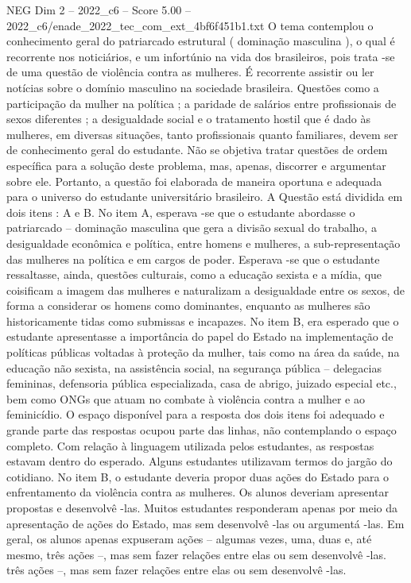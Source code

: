 \begin{textsample}{NEG Dim 2 – 2022\_c6 – Score 5.00 – 2022\_c6/enade\_2022\_tec\_com\_ext\_4bf6f451b1.txt}
O tema contemplou o conhecimento geral do patriarcado estrutural ( dominação masculina ), o qual é recorrente nos noticiários, e um infortúnio na vida dos brasileiros, pois trata -se de uma questão de violência contra as mulheres.
É recorrente assistir ou ler notícias sobre o domínio masculino na sociedade brasileira.
Questões como a participação da mulher na política ; a paridade de salários entre profissionais de sexos diferentes ; a desigualdade social e o tratamento hostil que é dado às mulheres, em diversas situações, tanto profissionais quanto familiares, devem ser de conhecimento geral do estudante.
Não se objetiva tratar questões de ordem específica para a solução deste problema, mas, apenas, discorrer e argumentar sobre ele.
Portanto, a questão foi elaborada de maneira oportuna e adequada para o universo do estudante universitário brasileiro.
A Questão está dividida em dois itens : A e B.
No item A, esperava -se que o estudante abordasse o patriarcado – dominação masculina que gera a divisão sexual do trabalho, a desigualdade econômica e política, entre homens e mulheres, a sub-representação das mulheres na política e em cargos de poder.
Esperava -se que o estudante ressaltasse, ainda, questões culturais, como a educação sexista e a mídia, que coisificam a imagem das mulheres e naturalizam a desigualdade entre os sexos, de forma a considerar os homens como dominantes, enquanto as mulheres são historicamente tidas como submissas e incapazes.
No item B, era esperado que o estudante apresentasse a importância do papel do Estado na implementação de políticas públicas voltadas à proteção da mulher, tais como na área da saúde, na educação não sexista, na assistência social, na segurança pública – delegacias femininas, defensoria pública especializada, casa de abrigo, juizado especial etc., bem como ONGs que atuam no combate à violência contra a mulher e ao feminicídio.
O espaço disponível para a resposta dos dois itens foi adequado e grande parte das respostas ocupou parte das linhas, não contemplando o espaço completo.
Com relação à linguagem utilizada pelos estudantes, as respostas estavam dentro do esperado.
Alguns estudantes utilizavam termos do jargão do cotidiano.
No item B, o estudante deveria propor duas ações do Estado para o enfrentamento da violência contra as mulheres.
Os alunos deveriam apresentar propostas e desenvolvê -las.
Muitos estudantes responderam apenas por meio da apresentação de ações do Estado, mas sem desenvolvê -las ou argumentá -las.
Em geral, os alunos apenas expuseram ações – algumas vezes, uma, duas e, até mesmo, três ações –, mas sem fazer relações entre elas ou sem desenvolvê -las. três ações –, mas sem fazer relações entre elas ou sem desenvolvê -las.

\end{textsample}
